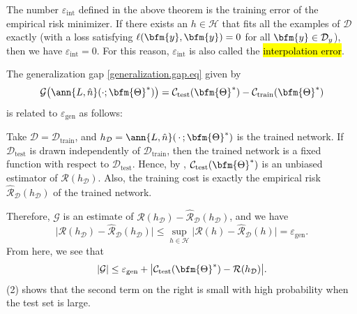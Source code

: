 The number $\varepsilon_\text{int}$ defined in the above theorem is the training error of the empirical risk minimizer.  If there exists an $h\in\mathcal{H}$ that fits all the examples of $\mathcal{D}$ exactly (with a loss satisfying $\ell(\bfm{y},\bfm{y})=0$ for all $\bfm{y}\in\mathcal{D}_y$), then we have $\varepsilon_\text{int}=0$. For this reason, $\varepsilon_\text{int}$ is also called the \hl{interpolation error}.
\begin{remark}\label{generalization.gap.rem}

The generalization gap \eqref{generalization.gap.eq} given by
$$\mathcal{G}\big(\ann{L,\hat{n}}(\cdot;\bfm{\Theta}^*)\big) = \mathcal{C}_\text{test}(\bfm{\Theta}^*) - \mathcal{C}_\text{train}(\bfm{\Theta}^*)$$ 
is related to $\varepsilon_\text{gen}$ as follows:

Take $\mathcal{D}=\mathcal{D}_\text{train}$, and $h_{\mathcal{D}}=\ann{L,\hat{n}}(\,\cdot\,;\bfm{\Theta}^*)$ is the trained network.    If $\mathcal{D}_\text{test}$ is drawn independently of $\mathcal{D}_\text{train}$, then the trained network is a fixed function with respect to $\mathcal{D}_\text{test}$.  Hence, by , $\mathcal{C}_\text{test}(\bfm{\Theta}^*)$ is an unbiased estimator of $\mathcal{R}(h_{\mathcal{D}})$.  Also, the training cost is exactly the empirical risk $\widehat{\mathcal{R}}_{\mathcal{D}}(h_{\mathcal{D}})$ of the trained network.

Therefore, $\mathcal{G}$ is an estimate of $\mathcal{R}(h_{\mathcal{D}})-\widehat{\mathcal{R}}_{\mathcal{D}}(h_{\mathcal{D}})$, and we have
$$
\big|\mathcal{R}(h_{\mathcal{D}})-\widehat{\mathcal{R}}_{\mathcal{D}}(h_{\mathcal{D}})\big|
\le \sup_{h\in\mathcal{H}}\big|\mathcal{R}(h)-\widehat{\mathcal{R}}_{\mathcal{D}}(h)\big|
= \varepsilon_\text{gen}.
$$
From here, we see that
$$
|\mathcal{G}| \le \varepsilon_\text{gen} + \big|\mathcal{C}_\text{test}(\bfm{\Theta}^*)-\mathcal{R}(h_{\mathcal{D}})\big|.
$$
 (2) shows that the second term on the right is small with high probability when the test set is large.
\end{remark}

